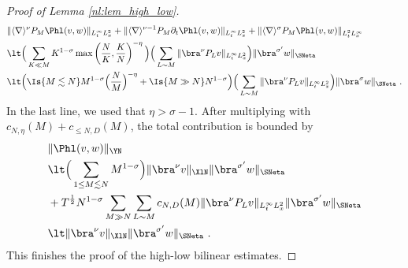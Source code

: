 \documentclass[11pt]{article}
\begin{document}
\begin{proof}[Proof of Lemma \ref{nl:lem_high_low}]
\begin{align*}
&\| \langle \nabla \rangle^{\nu} P_M \Phl(v,w) \|_{L_t^\infty L_x^2}+\| \langle \nabla \rangle^{\nu-1} P_M \partial_t\Phl(v,w) \|_{L_t^\infty L_x^2} + \| \langle \nabla \rangle^{\sigma} P_M \Phl(v,w) \|_{L_t^2 L_x^\infty}\\
&\lt  \Big( \sum_{K\ll M} K^{1-\sigma} \max \left( \frac{N}{K} , \frac{K}{N} \right)^{-\eta} \Big) \Big(\sum_{L\sim M} \| \bra^\nu P_L v \|_{L_t^\infty L_x^2} \Big) \| \bra^{\sigma^\prime} w \|_{\SNeta} \\
&\lt \Big( \Is{M\lesssim N} M^{1-\sigma} \Big( \frac{N}{M} \Big)^{-\eta} + \Is{M\gg N} N^{1-\sigma} \Big)\Big(\sum_{L\sim M} \| \bra^\nu P_L v \|_{L_t^\infty L_x^2} \Big) \| \bra^{\sigma} w \|_{\SNeta} ~. 
\end{align*}
In the last line, we used that \( \eta > \sigma-1 \). After multiplying with \( c_{N,\eta}(M)+c_{\leq N,D}(M) \), the total contribution is bounded by
\begin{align*}
&\|  \Phl(v,w) \|_{\YN} \\
&\lt \Big( \sum_{1\leq M\lesssim N} M^{1-\sigma}  \Big)  \| \bra^\nu  v \|_{\XlN} \| \bra^{\sigma^\prime} w \|_{\SNeta}\\
 &+ T^{\frac{1}{2}}N^{1-\sigma} \sum_{M\gg N} \sum_{L\sim M} c_{N,D}(M)  \| \bra^\nu P_L v \|_{L_t^\infty L_x^2}  \| \bra^{\sigma^\prime} w \|_{\SNeta} \\
 & \lt \| \bra^\nu  v \|_{\XlN} \| \bra^{\sigma^\prime} w \|_{\SNeta}~. 
 \end{align*}
 This finishes the proof of the high-low bilinear estimates. 
\end{proof}
\end{document}

